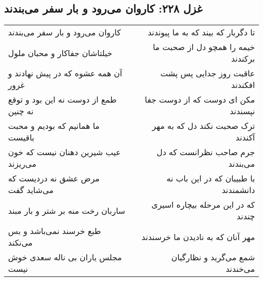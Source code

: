 \begin{center}
\section*{غزل ۲۲۸: کاروان می‌رود و بار سفر می‌بندند}
\label{sec:228}
\begin{longtable}{l p{0.5cm} r}
کاروان می‌رود و بار سفر می‌بندند
&&
تا دگربار که بیند که به ما پیوندند
\\
خیلتاشان جفاکار و محبان ملول
&&
خیمه را همچو دل از صحبت ما برکندند
\\
آن همه عشوه که در پیش نهادند و غرور
&&
عاقبت روز جدایی پس پشت افکندند
\\
طمع از دوست نه این بود و توقع نه چنین
&&
مکن ای دوست که از دوست جفا نپسندند
\\
ما همانیم که بودیم و محبت باقیست
&&
ترک صحبت نکند دل که به مهر آکندند
\\
عیب شیرین دهنان نیست که خون می‌ریزند
&&
جرم صاحب نظرانست که دل می‌بندند
\\
مرض عشق نه دردیست که می‌شاید گفت
&&
با طبیبان که در این باب نه دانشمندند
\\
ساربان رخت منه بر شتر و بار مبند
&&
که در این مرحله بیچاره اسیری چندند
\\
طبع خرسند نمی‌باشد و بس می‌نکند
&&
مهر آنان که به نادیدن ما خرسندند
\\
مجلس یاران بی ناله سعدی خوش نیست
&&
شمع می‌گرید و نظارگیان می‌خندند
\\
\end{longtable}
\end{center}
